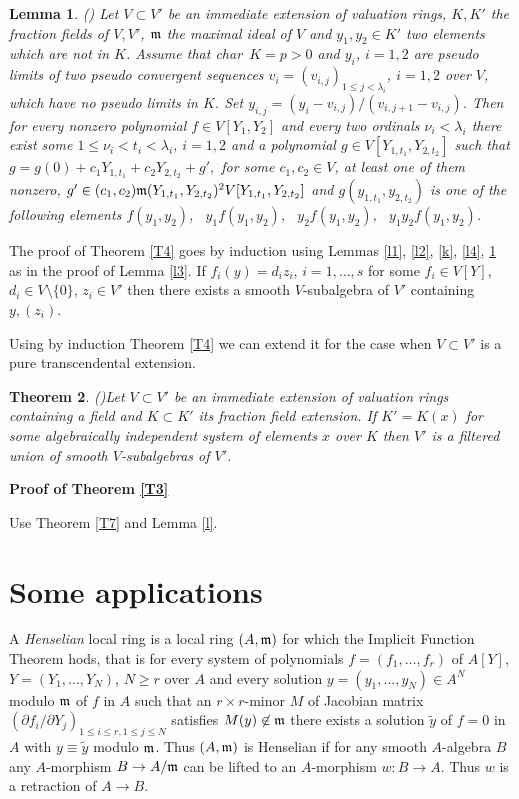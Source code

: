 \documentclass[12pt]{amsart}
\def\frk{\frak}               %
\def\mm{{\frk m}}
\let\to=\rightarrow
\newtheorem{Theorem}{Theorem}[]
\newtheorem{Lemma}[Theorem]{Lemma}
\theoremstyle{definition}
\theoremstyle{subsection-tweak}
\theoremstyle{theorem}
\theoremstyle{definition}
\begin{document}
\begin{Lemma}(\cite[Corollary 20]{P3}) \label{l5}
Let $V \subset V'$ be an  immediate extension of valuation rings,  $K, K'$ the fraction fields of $V, V'$, $\mm$ the maximal ideal of $V$ and  $y_1,y_2\in K'$ two  elements  which are not in  $K$. 
Assume that char\ $K=p>0$ and $y_i$, $i=1,2$ are   pseudo limits of two pseudo convergent sequences $v_i=(v_{i,j})_{1\leq j<\lambda_i}$, $i=1,2$ over $V$, which have no pseudo limits in $K$.
 Set $y_{i,j}=(y_i-v_{i,j})/(v_{i,j+1}-v_{i,j})$.
Then for every nonzero polynomial  $f\in V[Y_1,Y_2]$  and every two ordinals $\nu_i<\lambda_i$ 
there exist some  $1\leq \nu_i<t_i<\lambda_i$, $i=1,2$ and a polynomial $g\in V[Y_{1,t_1}, Y_{2,t_2}]$
 such that $g=g(0)+c_1  Y_{1,t_1}+c_2  Y_{2,t_2}+g',$ 
for some $c_1,c_2\in V$, at least one of them nonzero,   $g'\in  (c_1,c_2)\mm (Y_{1,t_1},Y_{2,t_2})^2   V[Y_{1,t_1}, Y_{2,t_2}]$ 
and $g(y_{1,t_1},y_{2,t_2})$ is one of the following elements
$f(y_1,y_2)$, \ $y_1f(y_1,y_2)$, \ $y_2f(y_1,y_2)$, \ $y_1y_2f(y_1,y_2)$.
\end{Lemma}
The proof of Theorem \ref{T4} goes by induction  using Lemmas \ref{l1}, \ref{l2},   \ref{k}, \ref{l4}, \ref{l5}
as  in the proof of Lemma \ref{l3}. If
 $f_i(y)=d_iz_i$, $i=1,\ldots, s$
for some $f_i\in V[Y]$, $d_i\in V\setminus \{0\}$, $z_i\in V'$ then there exists a smooth $V$-subalgebra of $V'$  containing $y,(z_i)$.



Using by induction Theorem \ref{T4} we can extend it  for the case when $V\subset V'$ is a pure transcendental extension.
\begin{Theorem}(\cite[Theorem 4]{P3})\label{T5} Let  $V\subset V'$ be an immediate  extension of valuation rings   containing  a field and $K\subset K'$ its fraction field extension. If $K'=K(x)$ for some algebraically independent system of elements $x$ over $K$ 
then $V'$ is a filtered union of smooth $V$-subalgebras of $V'$. 
\end{Theorem}

{\bf Proof of Theorem \ref{T3}} 

Use  Theorem \ref{T7} and Lemma \ref{l}.

\section{Some applications}

A {\em Henselian} local ring is a local ring 
 $(A,\mm)$ for which the Implicit Function Theorem hods, that is 
 for every system of polynomials  $f=(f_1,\ldots ,f_r) $ of $A[Y]$,
$Y=(Y_1,\ldots,Y_N)$, $N\geq r$ over  $A$ and every solution  $y=(y_1,\ldots,y_N)\in A^N$     modulo $\mm$ of $f$ in   $A$ such that an $r\times r$-minor $M$ of Jacobian matrix $(\partial f_i/\partial Y_j)_{1\leq i\leq r,1\leq j\leq N}$  satisfies $M(y)\not \in \mm$ there exists a solution $\tilde y$ of $f=0$ in  $A$ with $y\equiv {\tilde y}$ modulo $\mm$.
 Thus  $(A,\mm)$ is Henselian if for any smooth $A$-algebra $B$  any $A$-morphism $B\to A/\mm$ can be lifted to an $A$-morphism $w:B\to A$. Thus  $w$ is a retraction of $A\to B$.
\end{document}
